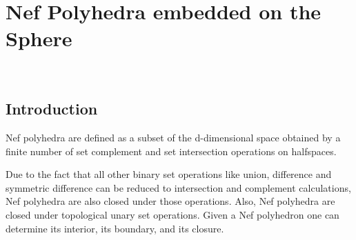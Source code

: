 \ccParDims

\chapter{Nef Polyhedra embedded on the Sphere}
\label{chapterNef_S2}
\\

\minitoc

\section{Introduction}

Nef polyhedra are defined as a subset of the d-dimensional space obtained by
a finite number of set complement and set intersection operations on
halfspaces. 

Due to the fact that all other binary set operations like union,
difference and symmetric difference can be reduced to intersection and
complement calculations, Nef polyhedra are also closed under those
operations. Also, Nef polyhedra are closed under topological unary 
set operations. Given a Nef polyhedron one can determine its interior, its
boundary, and its closure.

